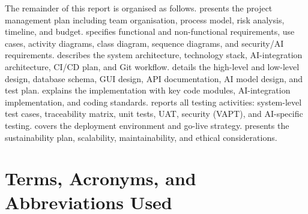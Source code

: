 The remainder of this report is organised as follows.
 presents the project management plan including team organisation,
process model, risk analysis, timeline, and budget.
 specifies functional and non-functional requirements, use cases,
activity diagrams, class diagram, sequence diagrams, and security/AI requirements.
 describes the system architecture, technology stack, AI-integration
architecture, CI/CD plan, and Git workflow.
 details the high-level and low-level design, database schema,
GUI design, API documentation, AI model design, and test plan.
 explains the implementation with key code modules, AI-integration
implementation, and coding standards.
 reports all testing activities: system-level test cases, traceability
matrix, unit tests, UAT, security (VAPT), and AI-specific testing.
 covers the deployment environment and go-live strategy.
 presents the sustainability plan, scalability, maintainability,
and ethical considerations.

\section{Terms, Acronyms, and Abbreviations Used}

